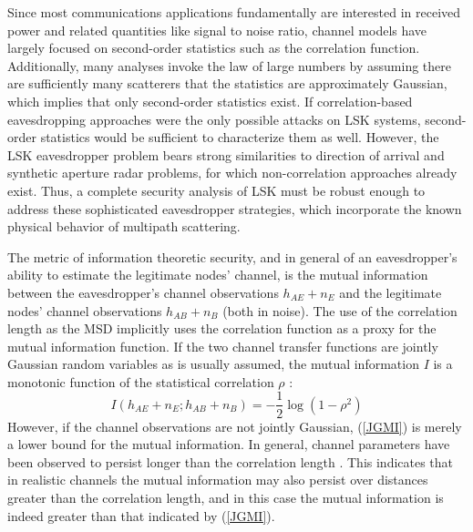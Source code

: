 \documentclass[12pt, titlepage]{article}
\begin{document}
Since most communications applications fundamentally are interested in received power and related quantities like signal to noise ratio, channel models have largely focused on second-order statistics such as the correlation function.  Additionally, many analyses invoke the law of large numbers by assuming there are sufficiently many scatterers that the statistics are approximately Gaussian, which implies that only second-order statistics exist.  If correlation-based eavesdropping approaches were the only possible attacks on LSK systems, second-order statistics would be sufficient to characterize them as well.  However, the LSK eavesdropper problem bears strong similarities to direction of arrival and synthetic aperture radar problems, for which non-correlation approaches already exist.  Thus, a complete security analysis of LSK must be robust enough to address these sophisticated eavesdropper strategies, which incorporate the known physical behavior of multipath scattering.  


The metric of information theoretic security, and in general of an eavesdropper's ability to estimate the legitimate nodes' channel, is the mutual information between the eavesdropper's channel observations $h_{AE}+n_E$ and the legitimate nodes' channel observations $h_{AB}+n_B$ (both in noise). The use of the correlation length as the MSD implicitly uses the correlation function as a proxy for the mutual information function.  If the two channel transfer functions are jointly Gaussian random variables as is usually assumed, the mutual information $I$ is a monotonic function of the statistical correlation $\rho$ \cite{cover2006-jgvars}:
\begin{equation}\label{JGMI}
I(h_{AE}+n_E;h_{AB}+n_B) = -\frac{1}{2}\log (1-\rho^2)
\end{equation}
However, if the channel observations are not jointly Gaussian, (\ref{JGMI}) is merely a lower bound for the mutual information.  In general, channel parameters have been observed to persist longer than the correlation length \cite{jakes1974, duel-hallen2007}.  This indicates that in realistic channels the mutual information may also persist over distances greater than the correlation length, and in this case the mutual information is indeed greater than that indicated by (\ref{JGMI}).
\end{document}
